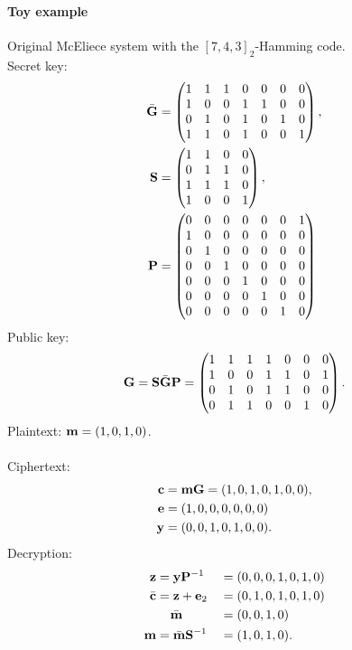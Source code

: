 \documentclass[a4paper, 11pt, openany]{book}
\begin{document}
\paragraph{Toy example}
Original McEliece system with the $[7,4,3]_2$-Hamming code.\\
Secret key:
\begin{align*}
	\bar{\bf G} &= \begin{pmatrix}
		1 & 1 & 1 & 0 & 0 & 0 & 0\\
		1 & 0 & 0 & 1 & 1 & 0 & 0\\
		0 & 1 & 0 & 1 & 0 & 1 & 0\\
		1 & 1 & 0 & 1 & 0 & 0 & 1\\
		\end{pmatrix},\\
	{\bf S} &= \begin{pmatrix}
	1 & 1 & 0 & 0\\
	0 & 1 & 1 & 0\\
	1 & 1 & 1 & 0\\
	1 & 0 & 0 & 1
	\end{pmatrix},\\
	{\bf P} &= \begin{pmatrix}
	0 & 0 & 0 & 0 & 0 & 0 & 1\\
	1 & 0 & 0 & 0 & 0 & 0 & 0\\
	0 & 1 & 0 & 0 & 0 & 0 & 0\\
	0 & 0 & 1 & 0 & 0 & 0 & 0\\
	0 & 0 & 0 & 1 & 0 & 0 & 0\\
	0 & 0 & 0 & 0 & 1 & 0 & 0\\
	0 & 0 & 0 & 0 & 0 & 1 & 0
	\end{pmatrix}
\end{align*}
Public key:
\[
	{\bf G} = {\bf S} \bar{\bf G} {\bf P} =
	\begin{pmatrix}
	1 & 1 & 1 & 1 & 0 & 0 & 0\\
	1 & 0 & 0 & 1 & 1 & 0 & 1\\
	0 & 1 & 0 & 1 & 1 & 0 & 0\\
	0 & 1 & 1 & 0 & 0 & 1 & 0
	\end{pmatrix}.
\]
Plaintext: ${\bf m} = (1,0,1,0)$.\\
~\\
Ciphertext:
\begin{align*}
	{\bf c} &= {\bf m} {\bf G} = (1,0,1,0,1,0,0),\\
	{\bf e} &= (1,0,0,0,0,0,0)\\
	{\bf y} &= (0,0,1,0,1,0,0).
\end{align*}
Decryption:
\begin{alignat*}{2}
	{\bf z} &= {\bf y} {\bf P}^{-1} &&= (0,0,0,1,0,1,0)\\
	\bar{\bf c} &= {\bf z} + {\bf e}_2 	&&= (0,1,0,1,0,1,0)\\
	& \phantom{ = } \ \bar{\bf m} &&= (0,0,1,0) \\
	{\bf m} &= \bar{\bf m} {\bf S}^{-1} &&= (1,0,1,0).
\end{alignat*}
\end{document}
